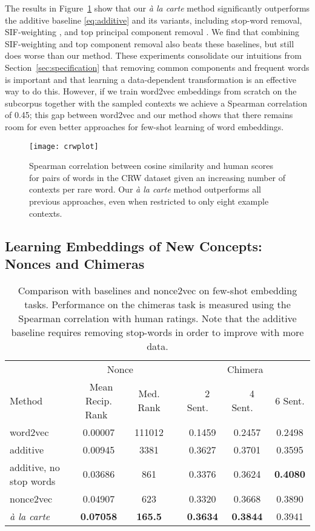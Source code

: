 \documentclass[11pt,a4paper]{article}
\begin{document}
The results in Figure~\ref{fig:crwplot} show that our {\em\` a la carte} method significantly outperforms the additive baseline \eqref{eq:additive} and its variants, including stop-word removal, SIF-weighting \cite{Arora:17}, and top principal component removal \cite{Mu:18}.
We find that combining SIF-weighting and top component removal also beats these baselines, but still does worse than our method.
These experiments consolidate our intuitions from Section~\ref{sec:specification} that removing common components and frequent words is important and that learning a data-dependent transformation is an effective way to do this.
However, if we train word2vec embeddings from scratch on the subcorpus together with the sampled contexts we achieve a Spearman correlation of 0.45;
this gap between word2vec and our method shows that there remains room for even better approaches for few-shot learning of word embeddings.

\begin{figure}[t!]
	\centering
	\texttt{[image: crwplot]}
	\caption{\label{fig:crwplot} Spearman correlation between cosine similarity and human scores for pairs of words in the CRW dataset given an increasing number of contexts per rare word. 
	Our {\em\`a la carte} method outperforms all previous approaches, even when restricted to only eight example contexts.
	}
\end{figure}

\subsection{Learning Embeddings of New Concepts: Nonces and Chimeras}\label{subsec:nonce}

\begin{table*}[t!]
	\centering
	\begin{threeparttable}
		\begin{tabular}{lcccccc}
			& \multicolumn{2}{c}{Nonce \cite{Herbelot:17}} && \multicolumn{3}{c}{Chimera \cite{Lazaridou:17}}\\
			Method & ~Mean Recip. Rank~ & Med. Rank && ~~2 Sent.~~ & ~~4 Sent.~~ & 6 Sent. \\
			\toprule
			word2vec & 0.00007 & 111012 && 0.1459 & 0.2457 & 0.2498 \\
			additive & 0.00945 & 3381 && 0.3627 & 0.3701 & 0.3595 \\
			additive, no stop words & 0.03686 & 861 && 0.3376 & 0.3624 & \bf0.4080 \\
			nonce2vec & 0.04907 & 623 && 0.3320 & 0.3668 & 0.3890 \\
			{\em\`a la carte} & \bf0.07058 & \bf165.5 && \bf0.3634 & \bf0.3844 & 0.3941 \\
			\bottomrule
		\end{tabular}
	\end{threeparttable}
	\caption{\label{tbl:nonce}
		Comparison with baselines and nonce2vec \cite{Herbelot:17} on few-shot embedding tasks.
		Performance on the chimeras task is measured using the Spearman correlation with human ratings. Note that the additive baseline requires removing stop-words in order to improve with more data.
	}
\end{table*}
\end{document}
